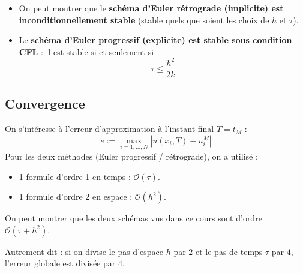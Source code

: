 \begin{theoreme}
\begin{itemize}
    \item On peut montrer que le \textbf{schéma d'Euler rétrograde (implicite) est inconditionnellement stable} (stable quels que soient les choix de $h$ et $\tau$).
    \item Le \textbf{schéma d'Euler progressif (explicite) est stable sous condition CFL} : il est stable si et seulement si 
    \[
        \tau \le \frac{h^2}{2k}
    \]
\end{itemize}
\end{theoreme}

\subsection{Convergence}

On s'intéresse à l'erreur d'approximation à l'instant final $T = t_M$ :
\[
    e := \max_{i=1,\dots,N} |u(x_i, T) - u_i^M|
\]
Pour les deux méthodes (Euler progressif / rétrograde), on a utilisé :
\begin{itemize}
    \item 1 formule d'ordre 1 en temps : $\mathcal{O}(\tau)$.
    \item 1 formule d'ordre 2 en espace : $\mathcal{O}(h^2)$.
\end{itemize}

\begin{proposition}
On peut montrer que les deux schémas vus dans ce cours sont d'ordre $\mathcal{O}(\tau + h^2)$.

Autrement dit : si on divise le pas d'espace $h$ par $2$ et le pas de temps $\tau$ par $4$, l'erreur globale est divisée par $4$.
\end{proposition}